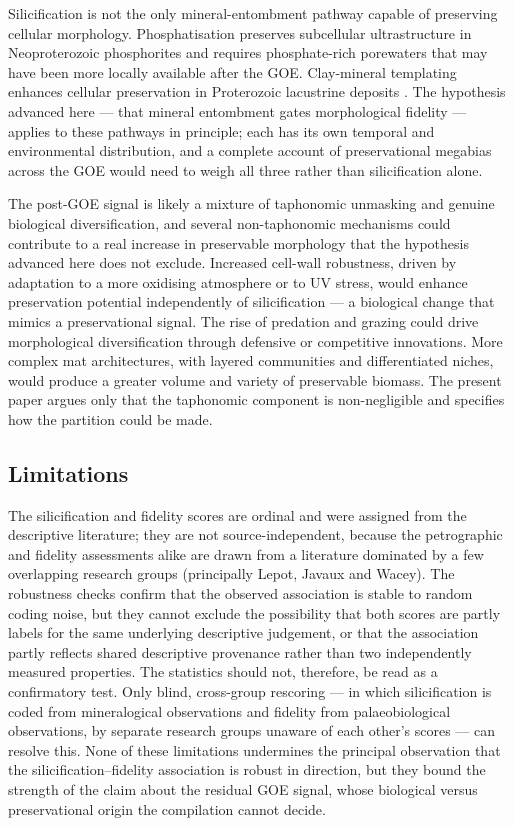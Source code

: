 \documentclass[11pt]{article}
\begin{document}
Silicification is not the only mineral-entombment pathway capable of preserving cellular morphology.
Phosphatisation preserves subcellular ultrastructure in Neoproterozoic phosphorites
\citep[the Doushantuo biota;][]{Tarhan2016} and requires phosphate-rich porewaters that may have been
more locally available after the GOE. Clay-mineral templating enhances cellular preservation in
Proterozoic lacustrine deposits \citep{Wacey2014}. The hypothesis advanced here --- that mineral
entombment gates morphological fidelity --- applies to these pathways in principle; each has its own
temporal and environmental distribution, and a complete account of preservational megabias across the
GOE would need to weigh all three rather than silicification alone.

The post-GOE signal is likely a mixture of taphonomic unmasking and genuine biological diversification,
and several non-taphonomic mechanisms could contribute to a real increase in preservable morphology
that the hypothesis advanced here does not exclude. Increased cell-wall robustness, driven by adaptation
to a more oxidising atmosphere or to UV stress, would enhance preservation potential independently of
silicification --- a biological change that mimics a preservational signal. The rise of predation and
grazing could drive morphological diversification through defensive or competitive innovations. More
complex mat architectures, with layered communities and differentiated niches, would produce a greater
volume and variety of preservable biomass. The present paper argues only that the taphonomic component
is non-negligible and specifies how the partition could be made.

\subsection{Limitations}

The silicification and fidelity scores are ordinal and were assigned from the descriptive
literature; they are not source-independent, because the petrographic and fidelity assessments alike
are drawn from a literature dominated by a few overlapping research groups (principally Lepot, Javaux
and Wacey). The robustness checks confirm that the observed association is stable to random coding
noise, but they cannot exclude the possibility that both scores are partly labels for the same
underlying descriptive judgement, or that the association partly reflects shared descriptive
provenance rather than two independently measured properties. The statistics should not, therefore,
be read as a confirmatory test. Only blind, cross-group rescoring --- in which silicification is
coded from mineralogical observations and fidelity from palaeobiological observations, by separate
research groups unaware of each other's scores --- can resolve this. None of these limitations
undermines the principal observation that the silicification--fidelity association is robust in
direction, but they bound the strength of the claim about the residual GOE signal, whose biological
versus preservational origin the compilation cannot decide.
\end{document}

